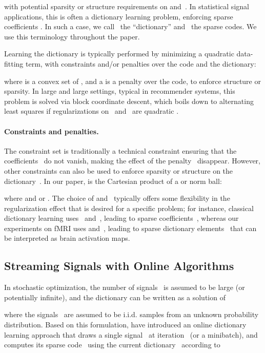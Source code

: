 \documentclass{article}
\begin{document}
with potential sparsity or structure requirements on  and~. In
statistical signal applications, this is often a dictionary learning
problem, enforcing sparse coefficients .
In such a case, we call~ the ``dictionary'' and~ the sparse codes.
We use this terminology throughout the paper.





Learning the dictionary is typically performed by minimizing a quadratic
data-fitting term, with constraints and/or penalties over the code and the dictionary:
 
where  is
a convex set of , and a  is a
penalty over the code, to enforce structure or sparsity.
In large  and large  settings, typical in recommender systems, this
problem is solved via block coordinate descent, which boils down to
alternating least squares if regularizations on~ and~ are
quadratic \cite{hastie_matrix_2014}.

\paragraph{Constraints and penalties.} The constraint set  is traditionally
a technical constraint ensuring that the coefficients~ do not vanish,
making the effect of the penalty~ disappear. However, other constraints can also be
used to enforce sparsity or structure on the dictionary~\citep[see][]{varoquaux_cohort-level_2013}. In our paper, is the Cartesian product of a  or  norm ball:

where  and
  or .
The choice of  and~ typically offers
some flexibility in the regularization effect that is desired for a specific problem;
for instance, classical dictionary learning uses~ and~,
leading to sparse coefficients~, whereas our experiments on fMRI
uses  and~, leading to sparse dictionary
elements~ that can be interpreted as brain activation maps.


\subsection{Streaming Signals with Online Algorithms}

In stochastic optimization, the number of signals~ is assumed to
be large (or potentially infinite), and the dictionary  can be written as a
solution of

where the signals~ are assumed to be i.i.d. samples from an unknown probability distribution.
Based on this formulation, \citet{mairal_online_2010} have introduced an online
dictionary learning approach that draws a single signal~ at iteration~ (or a
minibatch), and computes its sparse
code~ using the current dictionary~ according to
\end{document}
